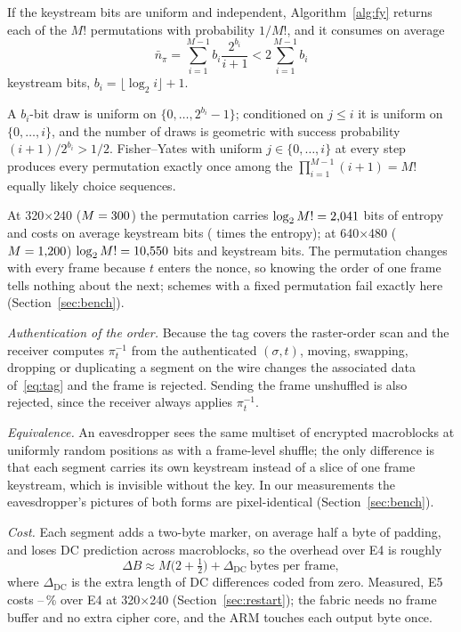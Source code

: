 \begin{proposition}\label{prop:perm}
If the keystream bits are uniform and independent, Algorithm~\ref{alg:fy} returns each of the $M!$ permutations with probability $1/M!$, and it consumes on average
\begin{equation}
\bar n_\pi = \sum_{i=1}^{M-1} b_i \frac{2^{b_i}}{i+1} < 2 \sum_{i=1}^{M-1} b_i
\label{eq:fybits}
\end{equation}
keystream bits, $b_i = \lfloor \log_2 i \rfloor + 1$.
\end{proposition}
\begin{IEEEproof}
A $b_i$-bit draw is uniform on $\{0, \ldots, 2^{b_i} - 1\}$; conditioned on $j \le i$ it is uniform on $\{0, \ldots, i\}$, and the number of draws is geometric with success probability $(i+1)/2^{b_i} > 1/2$. Fisher--Yates with uniform $j \in \{0, \ldots, i\}$ at every step produces every permutation exactly once among the $\prod_{i=1}^{M-1}(i+1) = M!$ equally likely choice sequences.
\end{IEEEproof}
At 320$\times$240 ($M = 300$) the permutation carries $\log_2 M! = 2{,}041$ bits of entropy and costs on average \FyBitsQVGA{} keystream bits (\FyRatioQVGA{} times the entropy); at 640$\times$480 ($M = 1{,}200$) $\log_2 M! = 10{,}550$ bits and \FyBitsVGA{} keystream bits. The permutation changes with every frame because $t$ enters the nonce, so knowing the order of one frame tells nothing about the next; schemes with a fixed permutation fail exactly here (Section~\ref{sec:bench}).

\textit{Authentication of the order.} Because the tag covers the raster-order scan and the receiver computes $\pi_t^{-1}$ from the authenticated $(\sigma, t)$, moving, swapping, dropping or duplicating a segment on the wire changes the associated data of~\eqref{eq:tag} and the frame is rejected. Sending the frame unshuffled is also rejected, since the receiver always applies $\pi_t^{-1}$.

\textit{Equivalence.} An eavesdropper sees the same multiset of encrypted macroblocks at uniformly random positions as with a frame-level shuffle; the only difference is that each segment carries its own keystream instead of a slice of one frame keystream, which is invisible without the key. In our measurements the eavesdropper's pictures of both forms are pixel-identical (Section~\ref{sec:bench}).

\textit{Cost.} Each segment adds a two-byte marker, on average half a byte of padding, and loses DC prediction across macroblocks, so the overhead over E4 is roughly
\begin{equation}
\Delta B \approx M\bigl(2 + \tfrac12\bigr) + \Delta_{\mathrm{DC}} \ \text{bytes per frame},
\label{eq:e5cost}
\end{equation}
where $\Delta_{\mathrm{DC}}$ is the extra length of DC differences coded from zero. Measured, E5 costs \RiOverheadOneMin--\RiOverheadOneMax\,\% over E4 at 320$\times$240 (Section~\ref{sec:restart}); the fabric needs no frame buffer and no extra cipher core, and the ARM touches each output byte once.


